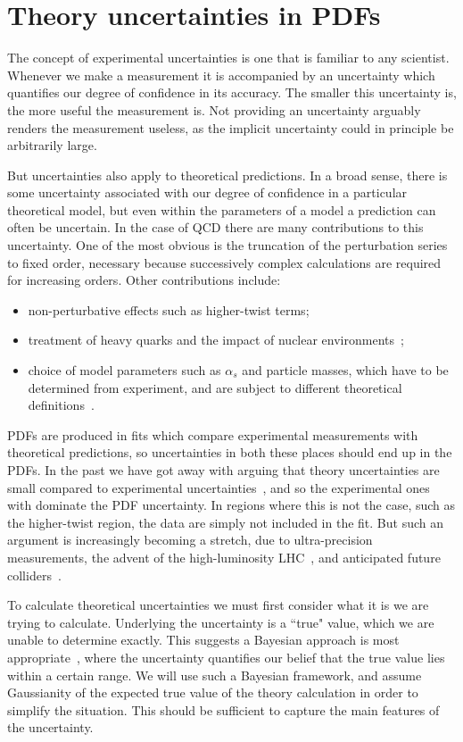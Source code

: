 \chapter{Theory uncertainties in PDFs}
\label{chapter:thuncs}
The concept of experimental uncertainties is one that is familiar to any scientist. Whenever we make a measurement it is accompanied by an uncertainty which quantifies our degree of confidence in its accuracy. The smaller this uncertainty is, the more useful the measurement is. Not providing an uncertainty arguably renders the measurement useless, as the implicit uncertainty could in principle be arbitrarily large. 

But uncertainties also apply to theoretical predictions. In a broad sense, there is some uncertainty associated with our degree of confidence in a particular theoretical model, but even within the parameters of a model a prediction can often be uncertain. In the case of QCD there are many contributions to this uncertainty. One of the most obvious is the truncation of the perturbation series to fixed order, necessary because successively complex calculations are required for increasing orders. Other contributions include: 
\begin{itemize}
\item non-perturbative effects such as higher-twist terms;
\item treatment of heavy quarks and the impact of nuclear environments~\cite{Forte:2010ta, Ball:2013gsa}; 
\item choice of model parameters such as $\alpha_s$ and particle masses, which have to be determined from experiment, and are subject to different theoretical definitions~\cite{Hoang:2014oea,Ball:2018iqk}.
\end{itemize}

PDFs are produced in fits which compare experimental measurements with theoretical predictions, so uncertainties in both these places should end up in the PDFs. In the past we have got away with arguing that theory uncertainties are small compared to experimental uncertainties~\cite{Ball:2013gsa}, and so the experimental ones with dominate the PDF uncertainty. In regions where this is not the case, such as the higher-twist region, the data are simply not included in the fit. But such an argument is increasingly becoming a stretch, due to ultra-precision measurements, the advent of the high-luminosity LHC~\cite{HL-LHC}, and anticipated future colliders~\cite{FCC, CLIC, ILC}.

To calculate theoretical uncertainties we must first consider what it is we are trying to calculate. Underlying the uncertainty is a ``true" value, which we are unable to determine exactly. This suggests a Bayesian approach is most appropriate~\cite{DAgostini:1998klm,DAgostini:2003bpu}, where the uncertainty quantifies our belief that the true value lies within a certain range. We will use such a Bayesian framework, and assume Gaussianity of the expected true value of the theory calculation in order to simplify the situation. This should be sufficient to capture the main features of the uncertainty. 

